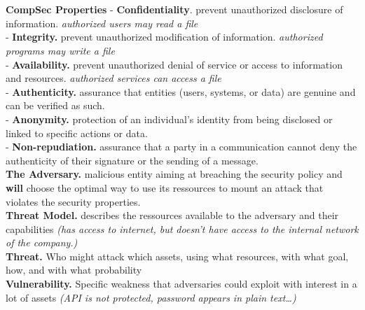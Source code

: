 \documentclass[9pt, a4paper]{extarticle}
\begin{document}
\small
\noindent
\\
\newpage
\\
\begin{minipage}[t]{0.495\textwidth}
	\noindent\textbf{CompSec Properties}
	- \textbf{Confidentiality}. prevent unauthorized disclosure of information. \textit{authorized users may read a file}\\
	- \textbf{Integrity.} prevent unauthorized modification of information. \textit{authorized programs may write a file}\\
	- \textbf{Availability.} prevent unauthorized denial of service or access to information and resources. \textit{authorized services can access a file}\\
	- \textbf{Authenticity.} assurance that entities (users, systems, or data) are genuine and can be verified as such.\\
	- \textbf{Anonymity.} protection of an individual's identity from being disclosed or linked to specific actions or data.\\
	- \textbf{Non-repudiation.} assurance that a party in a communication cannot deny the authenticity of their signature or the sending of a message.\\
	\noindent\textbf{The Adversary.} malicious entity aiming at breaching the security policy and \textbf{will} choose the optimal way to use its ressources to mount an attack that violates the security properties.\\
	\noindent \textbf{Threat Model.} describes the ressources available to the adversary and their capabilities \textit{(has access to internet, but doesn't have access to the internal network of the company.)}\\
	\noindent \textbf{Threat.} Who might attack which assets, using what resources, with what goal, how, and with what probability\\
	\noindent \textbf{Vulnerability.} Specific weakness that adversaries could exploit with interest in a lot of assets \textit{(API is not protected, password appears in plain text\dots)}\\
\end{minipage}
\hfill
\noindent
\end{document}
